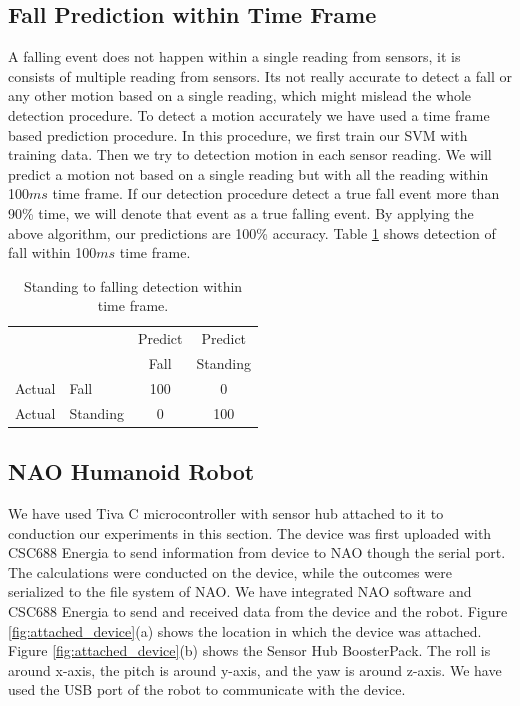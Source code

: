 \documentclass{llncs}
\begin{document}
\begin{sloppy}
\subsection*{Fall Prediction within Time Frame}

A falling event does not happen within a single reading from sensors, it is consists of multiple
reading from sensors.  Its not really accurate to detect a fall or any other motion based on a
single reading, which might mislead the whole detection procedure. To detect a motion accurately we
have used a time frame based prediction procedure. In this procedure, we first train our SVM with
training data. Then we try to detection motion in each sensor reading. We will predict a motion not
based on a single reading but with all the reading within 100$ms$ time frame. If our detection
procedure detect a true fall event more than 90\% time, we will denote that event as a true
falling event. By applying the above algorithm, our predictions are 100\% accuracy.
Table \ref{tab:StandingToFallingDetectionsvmframe} shows detection of fall within 100$ms$ time
frame.

\begin{table}[!h]
\caption{Standing to falling detection within time frame.}
	\label{tab:StandingToFallingDetectionsvmframe}
	\centering
		\begin{tabular} {l l |c |c}
			& & Predict& Predict \\ 
			& & Fall & Standing \\ \hline
			Actual& Fall & 100 & 0\\ \hline
			Actual& Standing & 0& 100\\ \hline
		\end{tabular}
\end{table}

\subsection{NAO Humanoid Robot}

We have used Tiva C microcontroller with sensor hub attached to it to conduction our experiments in
this section. The device was first uploaded with CSC688 Energia to send information from device to
NAO though the serial port. The calculations were conducted on the device, while the outcomes were
serialized to the file system of NAO. We have integrated NAO software and CSC688 Energia to send and
received data from the device and the robot. Figure \ref{fig:attached_device}(a) shows the location
in which the device was attached. Figure \ref{fig:attached_device}(b) shows the Sensor Hub
BoosterPack. The roll is around x-axis, the pitch is around y-axis, and the yaw is around z-axis. 
We have used the USB port of the robot to communicate with the device.  



\end{sloppy}
\end{document}
